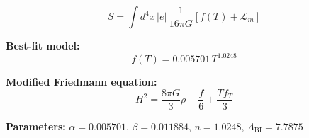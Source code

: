 
\begin{equation}
  S = \int d^4x \, |e| \, \frac{1}{16\pi G} \left[ f(T) + \mathcal{L}_m \right]
\end{equation}

\textbf{Best-fit model:}
\begin{equation}
  f(T) = 0.005701 \, T^{1.0248}
\end{equation}

\textbf{Modified Friedmann equation:}
\begin{equation}
  H^2 = \frac{8\pi G}{3} \rho - \frac{f}{6} + \frac{T f_T}{3}
\end{equation}

\textbf{Parameters:}
$\alpha = 0.005701$, \quad
$\beta = 0.011884$, \quad
$n = 1.0248$, \quad
$\Lambda_{\text{BI}} = 7.7875$